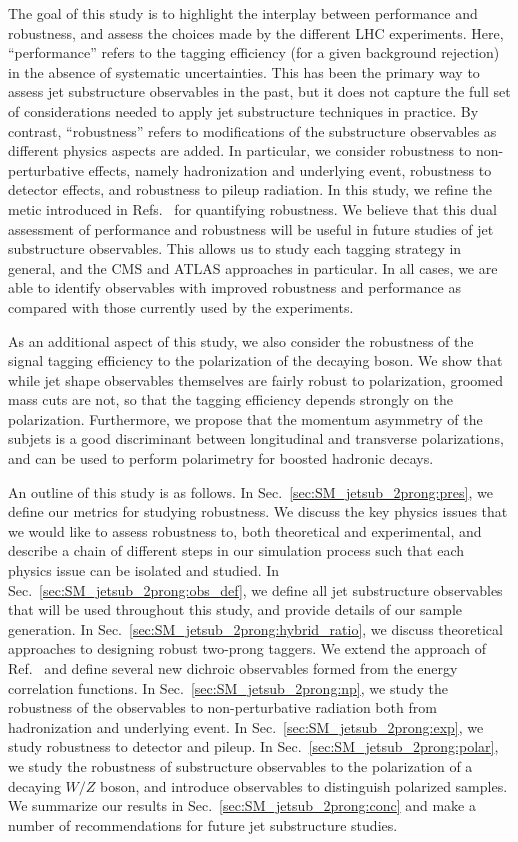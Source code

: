 The goal of this study is to highlight the interplay between performance and robustness, and assess the choices made by the different LHC experiments.
%
Here, ``performance'' refers to the tagging efficiency (for a given background rejection) in the absence of systematic uncertainties.
%
This has been the primary way to assess jet substructure observables in the past, but it does not capture the full set of considerations needed to apply jet substructure techniques in practice.
%
By contrast, ``robustness'' refers to modifications of the substructure observables as different physics aspects are added.
%
In particular, we consider robustness to non-perturbative effects, namely hadronization and underlying event, robustness to detector effects, and robustness to pileup radiation.
%
In this study, we refine the metic introduced
in Refs.~\cite{Dasgupta:2016ktv,Salam:2016yht} for quantifying
robustness.
%
We believe that this dual assessment of performance and
robustness will be useful in future studies of jet substructure
observables.
%
This allows us to study each tagging strategy in general, and the CMS
and ATLAS approaches in particular.
%
In all cases, we are able to identify observables with improved robustness and performance as compared with those currently used by the experiments.


As an additional aspect of this study, we also consider the robustness of the signal tagging efficiency to the polarization of the decaying boson.
%
We show that while jet shape observables themselves are fairly robust to polarization, groomed mass cuts are not, so that the tagging efficiency depends strongly on the polarization.
%
Furthermore, we propose that the momentum  asymmetry of the subjets is a good discriminant between longitudinal and transverse polarizations, and can be used to perform polarimetry for boosted hadronic decays. 

An outline of this study is as follows.
%
In Sec.~\ref{sec:SM_jetsub_2prong:pres}, we define our metrics for studying robustness.
%
We discuss the key physics issues that we would like to assess robustness to, both theoretical and experimental, and describe a chain of different steps in our simulation process such that each physics issue can be isolated and studied.
%
In Sec.~\ref{sec:SM_jetsub_2prong:obs_def}, we define all jet substructure observables that will be used throughout this study, and  provide details of our sample generation.
%
In Sec.~\ref{sec:SM_jetsub_2prong:hybrid_ratio}, we discuss theoretical approaches to designing robust two-prong taggers.
%
We extend the approach of Ref.~\cite{Salam:2016yht} and define several new dichroic observables formed from the energy correlation functions.  
%
In Sec.~\ref{sec:SM_jetsub_2prong:np}, we study the robustness of the observables to non-perturbative radiation both from hadronization and underlying event.
%
In Sec.~\ref{sec:SM_jetsub_2prong:exp}, we study robustness to detector and pileup.
%
In Sec.~\ref{sec:SM_jetsub_2prong:polar}, we study the robustness of substructure observables to the polarization of a decaying $W/Z$ boson, and introduce observables to distinguish polarized samples.
%
We summarize our results in Sec.~\ref{sec:SM_jetsub_2prong:conc} and make a number of recommendations for future jet substructure studies.

